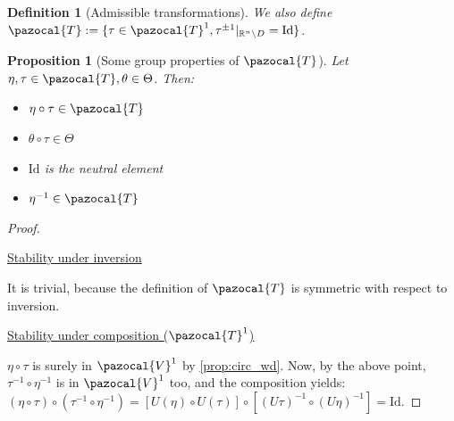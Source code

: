 \documentclass[english,a4paper,9pt,oneside]{scrbook}	%
\theoremstyle{break}
\newtheorem{defn}[equation]{Definition}
\newtheorem{prop}[equation]{Proposition}
\newenvironment{mproof}[1][\proofname]{%
  \begin{proof}[#1]$ $\par\nobreak\ignorespaces
}{%
  \end{proof}
}
\renewcommand*{\proofname}{Proof}
\theoremstyle{remark}
\newcommand{\mR}{\mathbb{R}}
\newcommand{\cV}{\pazocal{V}}
\newcommand{\cT}{\pazocal{T}}
\newcommand{\id}{\text{Id}}
\newcommand{\te}{\theta}
\newcommand{\Te}{\Theta}
\begin{document}
\begin{appendices}
\begin{defn}[Admissible transformations]
We also define $\cT:=\{\tau \in \cT^1, \tau^{\pm 1}|_{\mR^n\setminus D}=\id\}$. 

\end{defn}

\begin{prop}[Some group properties of $\cT$]
\label{prop:group}
Let $\eta, \tau \in \cT, \te \in \Te$. Then:

\begin{itemize}
	\item $\eta \circ \tau \in \cT$
	\item $\te \circ \tau \in \Te$
	\item $\id$ is the neutral element
	\item $\eta^{-1} \in \cT$
\end{itemize}

\end{prop}
\begin{mproof}

%
%
%
%
%

\underline{Stability under inversion}

It is trivial, because the definition of $\cT$ is symmetric with respect to inversion.

\underline{Stability under composition ($\cT^1$)}

$\eta \circ \tau$ is surely in $\cV^1$ by \cref{prop:circ_wd}. Now, by the above point, $\tau^{-1} \circ \eta^{-1}$ is in $\cV^1$ too, and the composition yields: $(\eta \circ \tau)\circ (\tau^{-1} \circ \eta^{-1}) = [U(\eta)\circ U(\tau)]\circ [(U\tau)^{-1} \circ (U\eta)^{-1}] = \id$.


\end{mproof}
\end{appendices}
\end{document}
